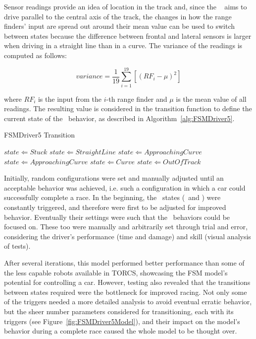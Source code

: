 Sensor readings provide an idea of location in the track and, since the \SL~ aims to drive parallel to the central axis of the track, the changes in how the range finders' input are spread out around their mean value can be used to switch between states because the difference between frontal and lateral sensors is larger when driving in a straight line than in a curve. The variance of the readings is computed as follows:

\begin{equation}
	variance = \frac{1}{19}\sum_{i=1}^{19}[(RF_i-\mu)^2]
\end{equation}

\noindent
where $RF_i$ is the input from the $i$-th range finder and $\mu$ is the mean value of all readings. The resulting value is considered in the transition function to define the current state of the \racing~behavior, as described in Algorithm~\ref{alg:FSMDriver5}.

\begin{algorithm}[h]%
\caption{FSMDriver5 Transition}%
\label{alg:FSMDriver5}%
\begin{algorithmic}
        \STATE $state \Leftarrow Stuck$
    \ELSE
			\STATE $state \Leftarrow StraightLine$
			\STATE $state \Leftarrow ApproachingCurve$
			\STATE $state \Leftarrow ApproachingCurve$
			\STATE $state \Leftarrow Curve$
		\ELSE
			\STATE $state \Leftarrow Out Of Track$
		\ENDIF
	\ENDIF
\end{algorithmic}
\end{algorithm}

Initially, random configurations were set and manually adjusted until an acceptable behavior was achieved, i.e. such a configuration in which a car could successfully complete a race. In the beginning, the \recovery~states (\OT~and \St) were constantly triggered, and therefore were first to be adjusted for improved behavior. Eventually their settings were such that the \racing~behaviors could be focused on. These too were manually and arbitrarily set through trial and error, considering the driver's performance (time and damage) and skill (visual analysis of tests).

After several iterations, this model performed better performance than some of the less capable robots available in TORCS, showcasing the FSM model's potential for controlling a car. However, testing also revealed that the transitions between states required were the bottleneck for improved racing. Not only some of the triggers needed a more detailed analysis to avoid eventual erratic behavior, but the sheer number parameters considered for transitioning, each with its triggers (see Figure~\ref{fig:FSMDriver5Model}), and their impact on the model's behavior during a complete race caused the whole model to be thought over.

